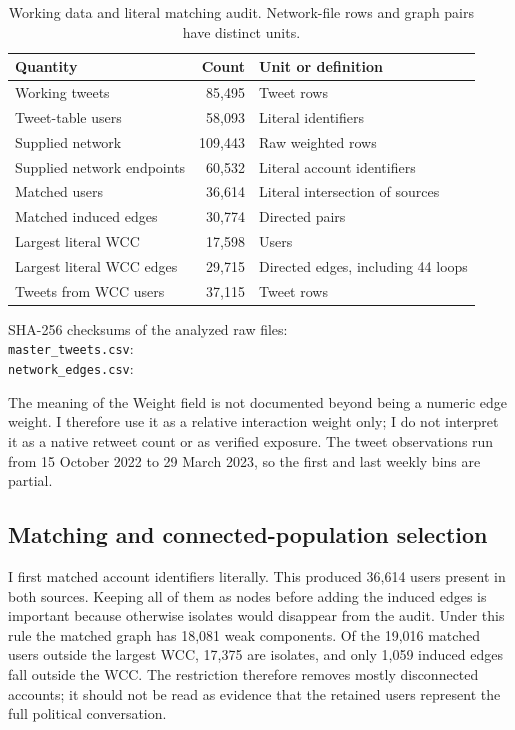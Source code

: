 \documentclass[11pt,a4paper]{article}
\begin{document}
\begin{table}[htbp]\centering\small
\caption{Working data and literal matching audit. Network-file rows and graph pairs have distinct units.}\label{tab:dataaudit}
\begin{tabularx}{\textwidth}{@{}XrX@{}}\toprule Quantity & Count & Unit or definition\\\midrule
Working tweets & 85,495 & Tweet rows\\
Tweet-table users & 58,093 & Literal identifiers\\
Supplied network & 109,443 & Raw weighted rows\\
Supplied network endpoints & 60,532 & Literal account identifiers\\
Matched users & 36,614 & Literal intersection of sources\\
Matched induced edges & 30,774 & Directed pairs\\
Largest literal WCC & 17,598 & Users\\
Largest literal WCC edges & 29,715 & Directed edges, including 44 loops\\
Tweets from WCC users & 37,115 & Tweet rows\\
\bottomrule\end{tabularx}
\vspace{2mm}\begin{minipage}{\textwidth}\footnotesize
SHA-256 checksums of the analyzed raw files:\\
\texttt{master\_tweets.csv}: \\
\texttt{network\_edges.csv}: 
\end{minipage}\end{table}

The meaning of the Weight field is not documented beyond being a numeric edge weight. I therefore use it as a relative interaction weight only; I do not interpret it as a native retweet count or as verified exposure. The tweet observations run from 15 October 2022 to 29 March 2023, so the first and last weekly bins are partial.

\subsection{Matching and connected-population selection}
I first matched account identifiers literally. This produced 36,614 users present in both sources. Keeping all of them as nodes before adding the induced edges is important because otherwise isolates would disappear from the audit. Under this rule the matched graph has 18,081 weak components. Of the 19,016 matched users outside the largest WCC, 17,375 are isolates, and only 1,059 induced edges fall outside the WCC. The restriction therefore removes mostly disconnected accounts; it should not be read as evidence that the retained users represent the full political conversation.
\end{document}
